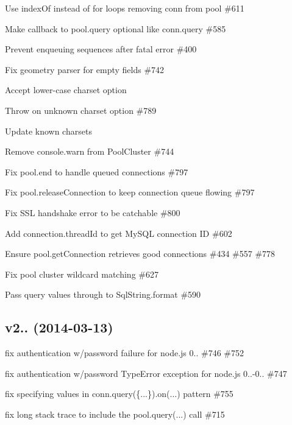 \begin{DoxyItemize}
\item Use index\+Of instead of for loops removing conn from pool \#611
\item Make callback to {\ttfamily pool.\+query} optional like {\ttfamily conn.\+query} \#585
\item Prevent enqueuing sequences after fatal error \#400
\item Fix geometry parser for empty fields \#742
\item Accept lower-\/case charset option
\item Throw on unknown charset option \#789
\item Update known charsets
\item Remove console.\+warn from Pool\+Cluster \#744
\item Fix {\ttfamily pool.\+end} to handle queued connections \#797
\item Fix {\ttfamily pool.\+release\+Connection} to keep connection queue flowing \#797
\item Fix S\+S\+L handshake error to be catchable \#800
\item Add {\ttfamily connection.\+thread\+Id} to get My\+S\+Q\+L connection I\+D \#602
\item Ensure {\ttfamily pool.\+get\+Connection} retrieves good connections \#434 \#557 \#778
\item Fix pool cluster wildcard matching \#627
\item Pass query values through to {\ttfamily Sql\+String.\+format} \#590
\end{DoxyItemize}

\subsection*{v2.. (2014-\/03-\/13)}


\begin{DoxyItemize}
\item fix authentication w/password failure for node.\+js 0.. \#746 \#752
\item fix authentication w/password Type\+Error exception for node.\+js 0..-\/0.. \#747
\item fix specifying {\ttfamily values} in {\ttfamily conn.\+query(\{...\}).on(...)} pattern \#755
\item fix long stack trace to include the {\ttfamily pool.\+query(...)} call \#715
\end{DoxyItemize}

